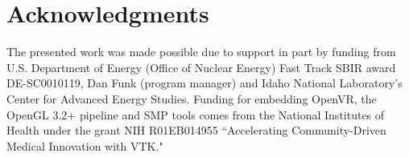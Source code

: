 \section*{Acknowledgments}

The presented work was made possible due to support in part by funding from U.S. Department of Energy (Office of Nuclear Energy) Fast Track SBIR award DE-SC0010119, Dan Funk (program manager) and Idaho National Laboratory's Center for Advanced Energy Studies. Funding for embedding OpenVR, the OpenGL 3.2+ pipeline and SMP tools comes from the National Institutes of Health under the grant NIH R01EB014955 ``Accelerating Community-Driven Medical Innovation with VTK."
